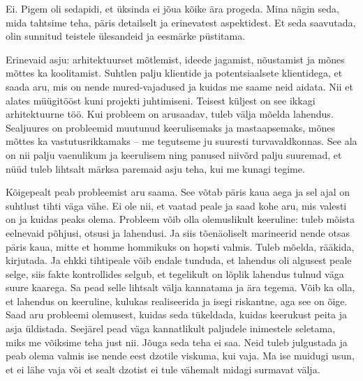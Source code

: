 
Ei. Pigem oli sedapidi, et üksinda ei jõua kõike ära progeda. Mina nägin seda, mida 
tahtsime teha, päris detailselt ja erinevatest aspektidest. Et seda saavutada, olin sunnitud teistele ülesandeid ja 
eesmärke püstitama.


Erinevaid asju: arhitektuurset mõtlemist, ideede jagamist, nõustamist ja mõnes mõttes ka koolitamist. Suhtlen palju 
klientide ja potentsiaalsete klientidega, et saada aru, mis on nende mured-vajadused ja kuidas me saame neid aidata. Nii et alates müügitööst kuni projekti 
juhtimiseni. Teisest küljest on see ikkagi arhitektuurne töö. Kui probleem on  
arusaadav, tuleb välja mõelda lahendus. Sealjuures on probleemid muutunud keerulisemaks ja 
mastaapsemaks, mõnes mõttes ka vastutusrikkamaks – me  
tegutseme ju suuresti turvavaldkonnas. See ala on nii palju 
vaenulikum ja keerulisem ning panused niivõrd palju suuremad, et nüüd tuleb
lihtsalt märksa paremaid asju teha, kui me kunagi tegime.


Kõigepealt peab probleemist aru saama. See võtab päris kaua aega ja sel ajal on suhtlust tihti väga vähe. Ei ole nii, et vaatad peale ja 
saad kohe aru, mis valesti on ja kuidas peaks olema. Probleem võib olla olemuslikult keeruline: tuleb mõista eelnevaid põhjusi, otsusi ja lahendusi. 
Ja siis tõenäoliselt marineerid nende 
otsas päris kaua, mitte et homme hommikuks on hopsti valmis. Tuleb mõelda, rääkida, kirjutada. Ja ehkki tihtipeale võib endale tunduda, et 
lahendus oli algusest peale selge, siis fakte kontrollides 
selgub, et tegelikult on lõplik lahendus tulnud väga suure kaarega. Sa pead selle lihtsalt välja kannatama ja ära tegema. Võib ka olla, et lahendus on keeruline, kulukas 
realiseerida ja isegi riskantne, aga see on õige. Saad aru probleemi olemusest, kuidas seda 
tükeldada, kuidas keerukust peita ja asja üldistada. Seejärel 
pead väga kannatlikult paljudele inimestele seletama, miks me võiksime teha 
just nii. Jõuga seda teha ei saa. Neid tuleb julgustada ja peab olema 
valmis ise nende eest dzotile viskuma, kui vaja. Ma ise muidugi usun, 
et ei lähe vaja või et sealt dzotist ei tule vähemalt midagi surmavat välja.
